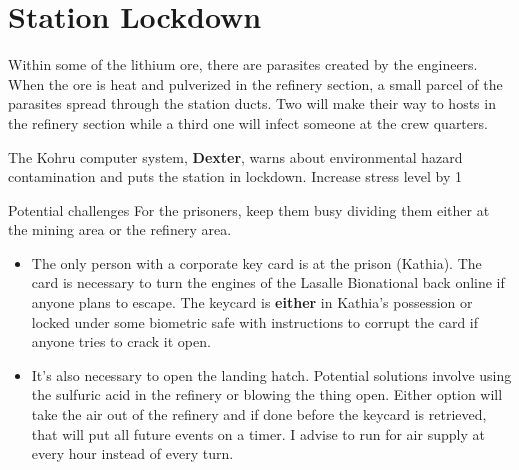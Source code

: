 \newsect

\section{Station Lockdown}



\begin{rpg-commentbox}{}
    
    Within some of the lithium ore, there are parasites created by the engineers. When the ore is heat and pulverized in the refinery section, a small parcel of the parasites spread through the station ducts. Two will make their way to hosts in the refinery section while a third one will infect someone at the crew quarters. 
    
    The Kohru computer system, \textbf{Dexter}, warns about environmental hazard contamination and puts the station in lockdown. Increase stress level by 1
\end{rpg-commentbox}    


\medskip
\begin{rpg-commentbox}{Potential challenges}
For the prisoners, keep them busy dividing them either at the mining area or the refinery area.

\begin{itemize}
    \item The only person with a corporate key card is at the prison (Kathia). The card is necessary to turn the engines of the Lasalle Bionational back online if anyone plans to escape. The keycard is \textbf{either} in Kathia's possession or locked under some biometric safe with instructions to corrupt the card if anyone tries to crack it open. 

    \item It's also necessary to open the landing hatch. Potential solutions involve using the sulfuric acid in the refinery or blowing the thing open. Either option will take the air out of the refinery and if done before the keycard is retrieved, that will put all future events on a timer. I advise to run for air supply at every hour instead of every turn.
\end{itemize}
\end{rpg-commentbox}



    


